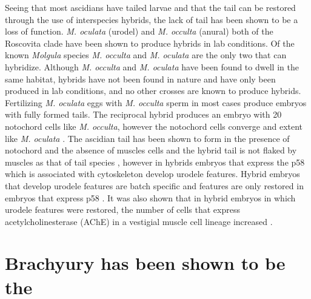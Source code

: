 Seeing that most ascidians have tailed larvae and that the tail can be restored through the use of interspecies hybrids, the lack of tail has been shown to be a loss of function. \textit{M. oculata} (urodel) and \textit{M. occulta} (anural) both of the Roscovita clade have been shown to produce hybrids in lab conditions. Of the known \textit{Molgula} species \textit{M. occulta} and \textit{M. oculata} are the only two that can hybridize. Although \textit{M. occulta} and \textit{M. oculata} have been found to dwell in the same habitat, hybrids have not been found in nature and have only been produced in lab conditions, and no other crosses are known to produce hybrids. Fertilizing \textit{M. oculata} eggs with \textit{M. occulta} sperm in most cases produce embryos with fully formed tails. The reciprocal hybrid produces an embryo with 20 notochord cells like \textit{M. occulta}, however the notochord cells converge and extent like \textit{M. oculata} \cite{swalla_interspecific_1990}. The ascidian tail has been shown to form in the presence of notochord and the absence of muscles cells \cite{miyamoto_formation_1985} and the hybrid tail is not flaked by muscles as that of tail species \cite{swalla_novel_1993}, however in hybrids embryos that express the p58 which is associated with cytoskeleton develop urodele features. Hybrid embryos that develop urodele features are batch specific and features are only restored in embryos that express p58 \cite{swalla_identification_1991,jeffery_factors_1992}. It was also shown that in hybrid embryos in which urodele features were restored, the number of cells that express acetylcholinesterase (AChE) in a vestigial muscle cell lineage increased \cite{jeffery_evolutionary_1991}. 

\section{Brachyury has been shown to be the  }

